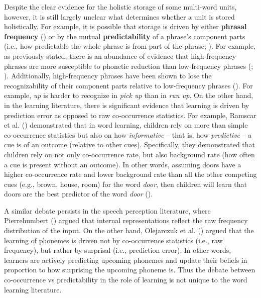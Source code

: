 \documentclass[
  12pt,
  letterpaper,
]{scrreport}
\begin{document}
Despite the clear evidence for the holistic storage of some multi-word
units, however, it is still largely unclear what determines whether a
unit is stored holistically. For example, it is possible that storage is
driven by either \textbf{phrasal frequency}
() or by the mutual
\textbf{predictability} of a phrase's component parts (i.e., how
predictable the whole phrase is from part of the phrase;
).
For example, as previously stated, there is an abundance of evidence
that high-frequency phrases are more susceptible to phonetic reduction
than low-frequency phrases (;
).
Additionally, high-frequency phrases have been shown to lose the
recognizability of their component parts relative to low-frequency
phrases
(). For example, \emph{up} is harder to recognize in
\emph{pick up} than in \emph{run up}. On the other hand, in the learning
literature, there is significant evidence that learning is driven by
prediction error as opposed to raw co-occurrence statistics. For
example, Ramscar et al.
()
demonstrated that in word learning, children rely on more than simple
co-occurrence statistics but also on how \emph{informative} -- that is,
how \emph{predictive} -- a cue is of an outcome (relative to other
cues). Specifically, they demonstrated that children rely on not only
co-occurrence rate, but also background rate (how often a cue is present
without an outcome). In other words, assuming doors have a higher
co-occurrence rate and lower background rate than all the other
competing cues (e.g., brown, house, room) for the word \emph{door}, then
children will learn that doors are the best predictor of the word
\emph{door}
().

A similar debate persists in the speech perception literature, where
Pierrehumbert
() argued that
internal representations reflect the raw frequency distribution of the
input. On the other hand, Olejarczuk et al.
()
argued that the learning of phonemes is driven not by co-occurrence
statistics (i.e., raw frequency), but rather by surprisal (i.e.,
prediction error). In other words, learners are actively predicting
upcoming phonemes and update their beliefs in proportion to how
surprising the upcoming phoneme is. Thus the debate between
co-occurrence vs predictability in the role of learning is not unique to
the word learning literature.
\end{document}
